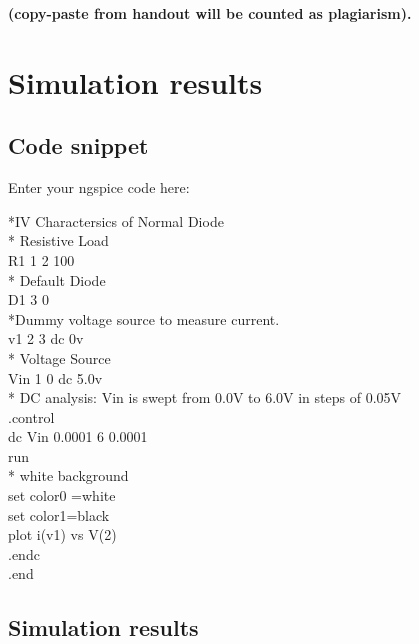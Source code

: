 \documentclass[12pt]{article}
\begin{document}


\textbf{(copy-paste from handout will be counted as plagiarism).} 



\section{Simulation results}%
\subsection{Code snippet}

Enter your ngspice code here:

*IV Charactersics of Normal Diode\\
* Resistive Load\\
R1 1 2 100\\
* Default Diode\\
D1 3 0 \\
*Dummy voltage source to measure current.\\
v1 2 3 dc 0v\\
* Voltage Source\\
Vin 1 0 dc 5.0v\\
* DC analysis: Vin is swept from 0.0V to 6.0V in steps of 0.05V\\
.control \\
dc Vin 0.0001 6 0.0001\\
run\\
* white background\\
set color0 =white\\
set color1=black\\
plot i(v1) vs V(2) \\
.endc\\
.end\\



\newpage
\subsection{Simulation results}
\end{document}
